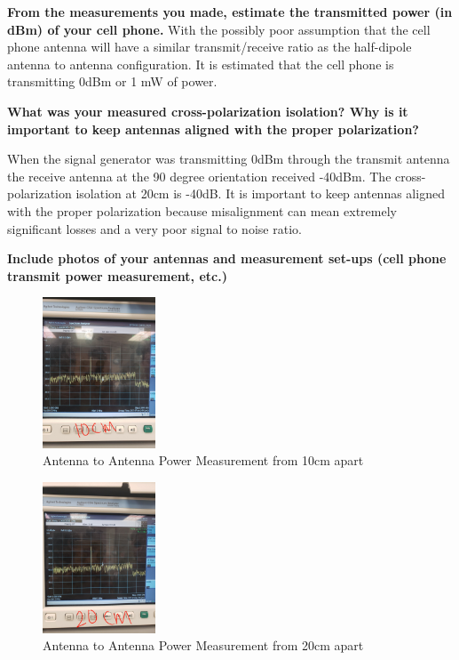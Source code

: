 \documentclass[journal]{IEEEtran}
\begin{document}
\textbf{ From the measurements you made, estimate the transmitted power (in dBm) of your cell phone.}
With the possibly poor assumption that the cell phone antenna will have a
similar transmit/receive ratio as the half-dipole antenna to antenna
configuration. It is estimated that the cell phone is transmitting 0dBm or 1 mW
of power.

\textbf{ What was your measured cross-polarization isolation? Why is it important to keep antennas aligned with the proper polarization?}

When the signal generator was transmitting 0dBm through the transmit antenna the
receive antenna at the 90 degree orientation received -40dBm.  The
cross-polarization isolation at 20cm is -40dB. It is important to keep antennas
aligned with the proper polarization because misalignment can mean extremely
significant losses and a very poor signal to noise ratio.


\textbf{ Include photos of your antennas and measurement set-ups (cell phone transmit power measurement, etc.)}

\begin{figure}[hp]
    \centering
    \includegraphics[width=0.3\textwidth]{txrx_10.JPG}
    \caption{\label{fig:txrx_10} Antenna to Antenna Power Measurement from 10cm apart}
\end{figure}

\begin{figure}[hp]
    \centering
    \includegraphics[width=0.3\textwidth]{txrx_20.JPG}
    \caption{\label{fig:txrx_20} Antenna to Antenna Power Measurement from 20cm apart}
\end{figure}
\end{document}
